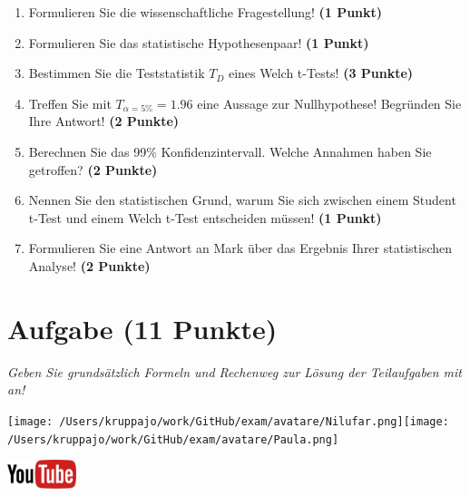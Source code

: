 \documentclass[a4paper, 9pt]{scrartcl}\usepackage[]{graphicx}\usepackage[]{xcolor}
\begin{document}
\begin{enumerate}
  \item Formulieren Sie die wissenschaftliche Fragestellung! \textbf{(1 Punkt)}
  \item Formulieren Sie das statistische Hypothesenpaar! \textbf{(1 Punkt)}
  \item Bestimmen Sie die Teststatistik $T_{D}$ eines  Welch t-Tests! \textbf{(3 Punkte)}
  \item Treffen Sie mit $T_{\alpha = 5\%} = 1.96$ eine Aussage zur Nullhypothese! Begründen Sie Ihre Antwort! \textbf{(2 Punkte)}
\item Berechnen Sie das 99\% Konfidenzintervall. Welche Annahmen haben Sie getroffen? \textbf{(2 Punkte)}
\item Nennen Sie den statistischen Grund, warum Sie sich zwischen einem Student t-Test und einem Welch t-Test entscheiden müssen! \textbf{(1 Punkt)}
\item Formulieren Sie eine Antwort an Mark über das Ergebnis Ihrer statistischen Analyse! \textbf{(2 Punkte)}
\end{enumerate} 
\clearpage

\section{Aufgabe \hfill (11 Punkte)}

\textit{Geben Sie grundsätzlich Formeln und Rechenweg zur Lösung der Teilaufgaben mit an!} \\[1Ex]
 

 
\begin{minipage}[t]{0.5\textwidth}
\texttt{[image: /Users/kruppajo/work/GitHub/exam/avatare/Nilufar.png]}\hspace{-4mm}\texttt{[image: /Users/kruppajo/work/GitHub/exam/avatare/Paula.png]}
\end{minipage}
\begin{minipage}[t]{0.5\textwidth}
\hfill
\href{https://youtu.be/QR90zyn0Iz8}{\includegraphics[width = 2cm]{img/youtube}}
\end{minipage}
\vspace{1ex}
\end{document}
